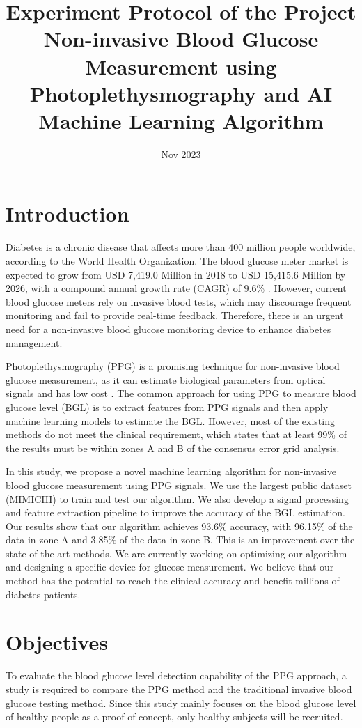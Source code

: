\documentclass{article}
\title{Experiment Protocol of the Project Non-invasive Blood Glucose Measurement using Photoplethysmography and AI Machine Learning Algorithm}
\date{Nov 2023}
\begin{document}
\maketitle

\section{Introduction}
Diabetes is a chronic disease that affects more than 400 million people worldwide, according to the World Health Organization.
The blood glucose meter market is expected to grow from USD 7,419.0 Million in 2018 to USD 15,415.6 Million by 2026, with a compound annual growth rate (CAGR) of 9.6\% \cite{noauthor_blood_2019}.
However, current blood glucose meters rely on invasive blood tests, which may discourage frequent monitoring and fail to provide real-time feedback.
Therefore, there is an urgent need for a non-invasive blood glucose monitoring device to enhance diabetes management.

Photoplethysmography (PPG) is a promising technique for non-invasive blood glucose measurement, as it can estimate biological parameters from optical signals and has low cost \cite{vargova_estimation_2023}.
The common approach for using PPG to measure blood glucose level (BGL) is to extract features from PPG signals and then apply machine learning models to estimate the BGL.
However, most of the existing methods do not meet the clinical requirement, which states that at least 99\% of the results must be within zones A and B of the consensus error grid analysis.

In this study, we propose a novel machine learning algorithm for non-invasive blood glucose measurement using PPG signals.
We use the largest public dataset (MIMICIII) to train and test our algorithm.
We also develop a signal processing and feature extraction pipeline to improve the accuracy of the BGL estimation.
Our results show that our algorithm achieves 93.6\% accuracy, with 96.15\% of the data in zone A and 3.85\% of the data in zone B.
This is an improvement over the state-of-the-art methods. We are currently working on optimizing our algorithm and designing a specific device for glucose measurement.
We believe that our method has the potential to reach the clinical accuracy and benefit millions of diabetes patients.

\section{Objectives}
To evaluate the blood glucose level detection capability of the PPG approach, a study is required to compare the PPG method and the traditional invasive blood glucose testing method.
Since this study mainly focuses on the blood glucose level of healthy people as a proof of concept, only healthy subjects will be recruited.
\end{document}
